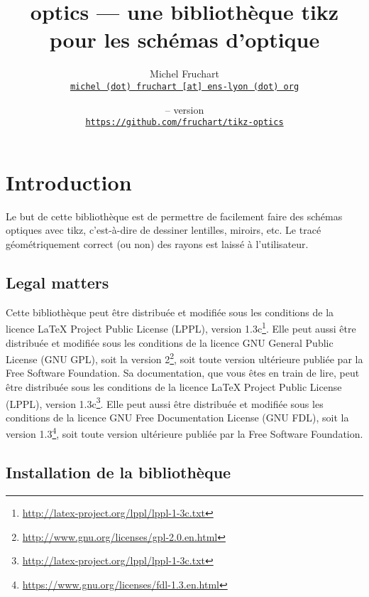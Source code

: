 \documentclass[a4paper]{ltxdoc}
\begin{document}
\VerbatimFootnotes

\title{optics --- une bibliothèque tikz pour les schémas d'optique}
\author{Michel Fruchart \\
\href{mailto:michel (dot) fruchart [at] ens-lyon (dot) org}{\texttt{michel (dot) fruchart [at] ens-lyon (dot) org}}}

\date{\tikzopticsversiondate{} -- version \tikzopticsversion \\[0.15cm]
\large\href{https://github.com/fruchart/tikz-optics}{\texttt{https://github.com/fruchart/tikz-optics}}}

\maketitle

\section{Introduction}

Le but de cette bibliothèque est de permettre de facilement faire des schémas optiques avec tikz, c'est-à-dire de dessiner lentilles, miroirs, etc. Le tracé géométriquement correct (ou non) des rayons est laissé à l'utilisateur.


\subsection{Legal matters}

Cette bibliothèque peut être distribuée et modifiée sous les conditions de la licence LaTeX Project Public License (LPPL), version 1.3c\footnote{\url{http://latex-project.org/lppl/lppl-1-3c.txt}}. Elle peut aussi être distribuée et modifiée sous les conditions de la licence GNU General Public License (GNU GPL), soit la version 2\footnote{\url{http://www.gnu.org/licenses/gpl-2.0.en.html}}, soit toute version ultérieure publiée par la Free Software Foundation. Sa documentation, que vous êtes en train de lire, peut être distribuée sous les conditions de la licence LaTeX Project Public License (LPPL), version 1.3c\footnote{\url{http://latex-project.org/lppl/lppl-1-3c.txt}}. Elle peut aussi être distribuée et modifiée sous les conditions de la licence GNU Free Documentation License (GNU FDL), soit la version 1.3\footnote{\url{https://www.gnu.org/licenses/fdl-1.3.en.html}}, soit toute version ultérieure publiée par la Free Software Foundation.

\subsection{Installation de la bibliothèque}
\end{document}
